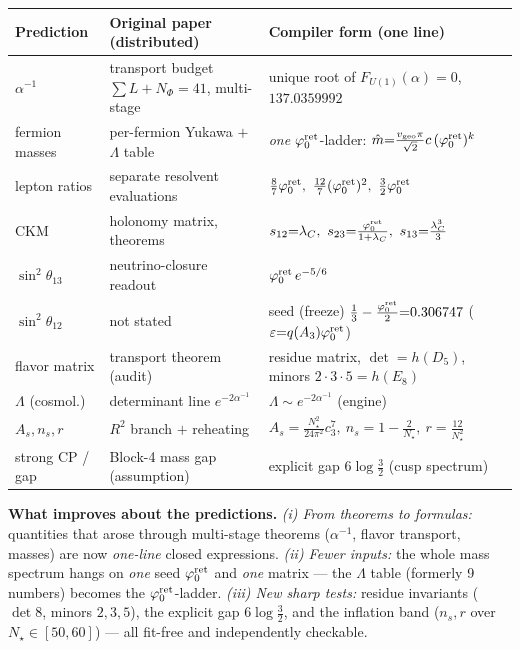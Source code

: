 \begin{center}\small
\renewcommand{\arraystretch}{1.25}
\begin{tabularx}{\linewidth}{@{}p{3.2cm}p{4.4cm}Y@{}}
\toprule
\textbf{Prediction} & \textbf{Original paper (distributed)} & \textbf{Compiler form (one line)} \\
\midrule
$\alpha^{-1}$ & transport budget $\sum L{+}N_\Phi{=}41$, multi-stage & unique root of $F_{U(1)}(\alpha){=}0$, $137.0359992$ \\
fermion masses & per-fermion Yukawa $+$ $\Lambda$ table & \emph{one} $\varphi_0^{\mathrm{ret}}$-ladder: $\hat m{=}\tfrac{v_{\mathrm{geo}}\pi}{\sqrt2}c\,(\varphi_0^{\mathrm{ret}})^{k}$ \\
lepton ratios & separate resolvent evaluations & $\tfrac87\phiz,\ \tfrac{12}7(\phiz)^2,\ \tfrac32\phiz$ \\
CKM & holonomy matrix, theorems & $s_{12}{=}\lambda_C,\ s_{23}{=}\tfrac{\phiz}{1+\lambda_C},\ s_{13}{=}\tfrac{\lambda_C^3}3$ \\
$\sin^2\theta_{13}$ & neutrino-closure readout & $\varphi_0^{\mathrm{ret}}\,e^{-5/6}$ \\
$\sin^2\theta_{12}$ & not stated & seed (freeze) $\tfrac13-\tfrac{\varphi_0^{\mathrm{ret}}}{2}{=}0.306747$ ($\varepsilon{=}q(A_3)\varphi_0^{\mathrm{ret}}$) \\
flavor matrix & transport theorem (audit) & residue matrix, $\det{=}h(D_5)$, minors $2{\cdot}3{\cdot}5{=}h(E_8)$ \\
$\Lambda$ (cosmol.) & determinant line $e^{-2\alpha^{-1}}$ & $\Lambda\sim e^{-2\alpha^{-1}}$ (engine) \\
$A_s,n_s,r$ & $R^2$ branch $+$ reheating & $A_s{=}\tfrac{N_\star^2}{24\pi^2}c_3^7,\ n_s{=}1{-}\tfrac2{N_\star},\ r{=}\tfrac{12}{N_\star^2}$ \\
strong CP / gap & Block-4 mass gap (assumption) & explicit gap $6\log\tfrac32$ (cusp spectrum) \\
\bottomrule
\end{tabularx}
\end{center}

\par\smallskip\noindent\textbf{What improves about the predictions.}
\emph{(i) From theorems to formulas:} quantities that arose through multi-stage theorems
($\alpha^{-1}$, flavor transport, masses) are now \emph{one-line} closed expressions.
\emph{(ii) Fewer inputs:} the whole mass spectrum hangs on \emph{one} seed $\varphi_0^{\mathrm{ret}}$ and \emph{one}
matrix --- the $\Lambda$ table (formerly 9 numbers) becomes the $\varphi_0^{\mathrm{ret}}$-ladder.
\emph{(iii) New sharp tests:} residue invariants ($\det 8$, minors $2{,}3{,}5$), the explicit gap
$6\log\tfrac32$, and the inflation band ($n_s,r$ over $N_\star\in[50,60]$) --- all fit-free and
independently checkable.

